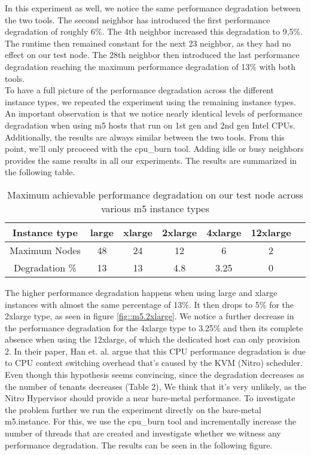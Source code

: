 \noindent
In this experiment as well, we notice the same performance degradation between the two tools. The second 
neighbor has introduced the first performance degradation of roughly 6\%. The 4th neighbor increased 
this degradation to 9,5\%. The runtime then remained constant for the next 23 neighbor, as they had no 
effect on our test node. The 28th neighbor then introduced the last performance degradation reaching the 
maximum performance degradation of 13\% with both tools. \\
To have a full picture of the performance degradation across the different instance types, we repeated 
the experiment using the remaining instance types. An important observation is that we notice nearly 
identical levels of performance degradation when using m5 hosts that run on 1st gen and 2nd gen Intel 
CPUs. Additionally, the results are always similar between the two tools. From this point, we'll only prcoceed 
with the cpu\_burn tool. Adding idle or busy neighbors provides 
the same results in all our experiments. The results are summarized in the following table. 
\begin{table}[H]
\centering
\begin{tabular}{ c|c|c|c|c|c|c }
 Instance type & large & xlarge & 2xlarge & 4xlarge  & 12xlarge  \\
 \hline
 Maximum Nodes & 48 & 24 & 12 & 6 & 2 \\
 \hline
Degradation \% & 13 & 13 & 4.8 & 3.25 & 0  \\ 

\end{tabular}
\caption{Maximum achievable performance degradation on our test node across various m5 instance types}
\end{table}
\noindent
The higher performance degradation happens when using large and xlarge instances with almost the same 
percentage of 13\%. It then drops to 5\% for the 2xlarge type, as seen in figure \ref{fig::m5.2xlarge}. We notice 
a further decrease in the performance degradation for the 4xlarge type to 3.25\% and then its complete 
absence when using the 12xlarge, of which the dedicated host can only provision 2. 
In their paper, Han et. al. \cite{contention} argue that this CPU performance degradation is due to CPU 
context switching overhead that's caused by the KVM (Nitro) scheduler. Even though this hypothesis 
seems convincing, since the degradation decreases as the number of tenants decreases (Table 2), 
We think that it's very unlikely, as the Nitro Hypervisor should provide a near bare-metal performance. 
To investigate the problem further we run the experiment directly on the bare-metal m5.instance. For this, we use 
the cpu\_burn tool and incrementally increase the number of threads that are created and investigate 
whether we witness any performance degradation. The results can be seen in the following figure.

